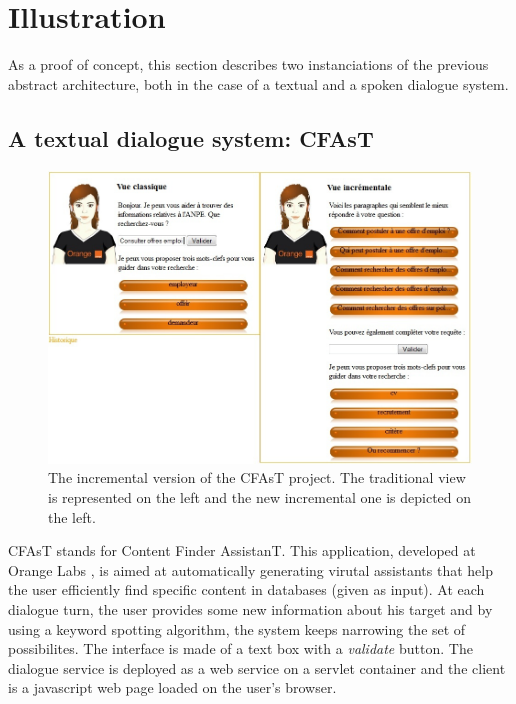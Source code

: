         
\section{Illustration}

        As a proof of concept, this section describes two instanciations of the previous abstract architecture, both in the case of a textual and a spoken dialogue system.

	\subsection{A textual dialogue system: CFAsT}
    
    	\begin{figure}[ht]
          \centering
          \includegraphics[scale=0.6]{figures/CFAsTIncr.jpg}
          \caption{The incremental version of the CFAsT project. The traditional view is represented on the left and the new incremental one is depicted on the left.}
          \label{fig:CFAsTIncr}
        \end{figure}
        
        CFAsT stands for Content Finder AssistanT. This application, developed at Orange Labs \cite{Laroche2014,Laroche2015}, is aimed at automatically generating virutal assistants that help the user efficiently find specific content in databases (given as input). At each dialogue turn, the user provides some new information about his target and by using a keyword spotting algorithm, the system keeps narrowing the set of possibilites. The interface is made of a text box with a \textit{validate} button. The dialogue service is deployed as a web service on a servlet container and the client is a javascript web page loaded on the user's browser.
        
